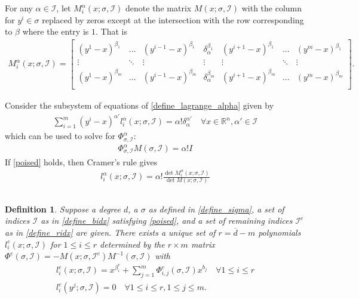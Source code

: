 \documentclass{article}
\newtheorem{definition}{Definition}[theorem]
\theoremstyle{case}
\newcommand{\Rn}{\mathbb R^n}
\newcommand{\bidx}{{\mathcal I}}
\newcommand{\ridx}{{\mathcal I^e}}
\begin{document}
For any $\alpha \in \bidx$, let $M^{\alpha}_i(x; \sigma, \bidx)$ denote the matrix $M(x; \sigma, \bidx)$ with the column for $y^i \in \sigma$ replaced by zeros except at the 
intersection with the row corresponding to $\beta$ where the entry is $1$.
That is
\begin{align}
M_i^{\alpha}(x; \sigma, \bidx) = \begin{bmatrix}
\left(y^1 - x\right)^{\beta_1} & \ldots & \left(y^{i-1} - x\right)^{\beta_1} & \delta^{\beta_1}_{\alpha} & \left(y^{i+1} - x\right)^{\beta_1} & \ldots &\left(y^m - x\right)^{\beta_1} \\
\vdots                         & \ddots & \vdots                             & \vdots                    & \vdots                             & \ddots & \vdots                         \\
\left(y^1 - x\right)^{\beta_m} & \ldots & \left(y^{i-1} - x\right)^{\beta_m} & \delta^{\beta_m}_{\alpha} & \left(y^{i+1} - x\right)^{\beta_m} & \ldots & \left(y^m - x\right)^{\beta_m} \\
\end{bmatrix}. \label{define_m}
\end{align}

Consider the subsystem of equations of \cref{define_lagrange_alpha} given by
\begin{align*}
\sum_{i = 1}^m (y^i - x)^{\alpha'}l^{\alpha}_i(x; \sigma, \bidx) = \alpha! \delta_{\alpha}^{\alpha'} \quad \forall x\in\Rn,\alpha' \in \bidx
\end{align*}
which can be used to solve for $\Phi^{\alpha}_{\sigma, \bidx}$:
\begin{align*}
\Phi^{\alpha}_{\sigma, \bidx}
M(\sigma, \bidx)
=\alpha!I
\end{align*}
If \cref{poised} holds, then Cramer's rule gives
\begin{align*}
l_i^{\alpha}(x; \sigma, \bidx) = \alpha! \frac{\det M_i^{\alpha}(x; \sigma, \bidx)}{\det M(x; \sigma, \bidx)}
\end{align*}



\subsection{}

\begin{definition}
Suppose a degree $d$, a $\sigma$ as defined in \cref{define_sigma}, a set of indices $\bidx$ as in \cref{define_bidx} satisfying \cref{poised}, and 
a set of remaining indices $\ridx$ as in \cref{define_ridx} are given.
There exists a unique set of $r = \overline d - m$ polynomials 
$l^e_i(x; \sigma, \bidx)$ for $1 \le i \le r$ determined by the $r \times m$ matrix 
$\Phi^e(\sigma, \bidx) = -M(x; \sigma, \ridx)M^{-1}(\sigma, \bidx)$ with
\begin{align*}
l^e_i(x; \sigma, \bidx) = x^{\beta^e_i} + \sum_{j = 1}^{m} \Phi_{i, j}^e(\sigma, \bidx)x^{b_j} \quad \forall 1 \le i \le r \\
l^e_i(y^j; \sigma, \bidx) = 0 \quad \forall 1 \le i \le r, 1 \le j \le m.
\end{align*}
\end{definition}
\end{document}
